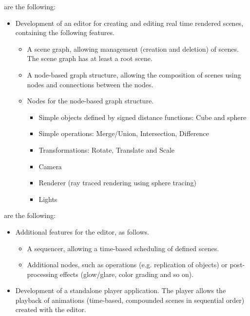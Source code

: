 \documentclass[%
    a4paper,    %
    justified,  %
    nobib,      %
    openany     %
]{tufte-book}
\begin{document}
 are the following:
\begin{itemize}
  \item Development of an editor for creating and editing real time rendered
    scenes, containing the following features.
    \begin{itemize}
      \item A scene graph, allowing management (creation and deletion) of
        scenes. The scene graph has at least a root scene.
    \item A node-based graph structure, allowing the composition of scenes using
      nodes and connections between the nodes.
    \item Nodes for the node-based graph structure.
      \begin{itemize}
        
        \item Simple objects defined by signed distance functions: Cube and
          sphere
        \item Simple operations: Merge/Union, Intersection, Difference
        \item Transformations: Rotate, Translate and Scale
        \item Camera
        \item Renderer (ray traced rendering using sphere tracing)
        \item Lights
      \end{itemize}
    \end{itemize}
\end{itemize}

 are the following:
\begin{itemize}
  \item Additional features for the editor, as follows.
  \begin{itemize}
    \item A sequencer, allowing a time-based scheduling of defined scenes.
    \item Additional nodes, such as operations (e.g. replication of objects)
      or post-processing effects (glow/glare, color grading and so on).
  \end{itemize}
  \item Development of a standalone player application. The player allows the
    playback of animations (time-based, compounded scenes in sequential order)
    created with the editor.
\end{itemize}
\end{document}
